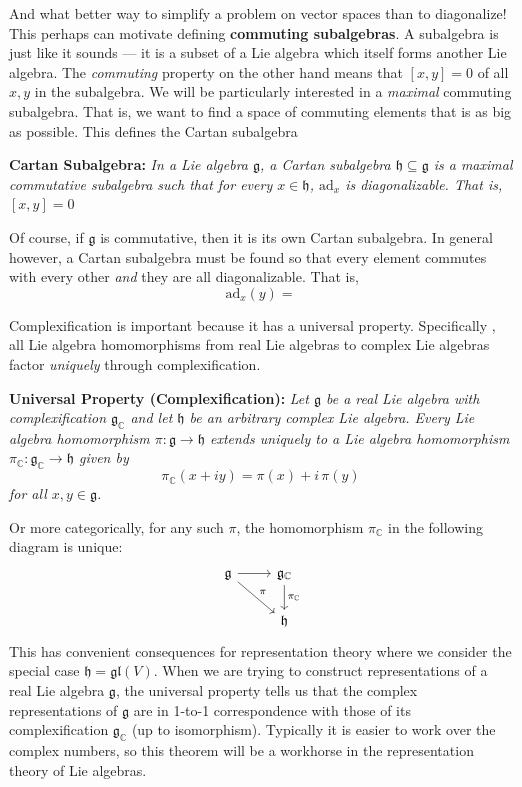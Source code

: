 \documentclass{article}
\renewcommand{\t}[1]{\text{#1}}
\newcommand{\definition}[2]{
	\begin{center}
		\begin{tcolorbox}[colframe=MidnightBlue, colback=black!5, arc=2mm, outer arc=0.5mm, width=\linewidth, left=2mm, right=2mm]
			\textbf{#1:} \emph{#2}	
		\end{tcolorbox}
	\end{center}\noindent}
\begin{document}
And what better way to simplify a problem on vector spaces than to diagonalize! This perhaps can motivate defining \textbf{commuting subalgebras}. A subalgebra is just like it sounds --- it is a subset of a Lie algebra which itself forms another Lie algebra. The \emph{commuting} property on the other hand means that $[x,y]=0$ of all $x,y$ in the subalgebra. We will be particularly interested in a \emph{maximal} commuting subalgebra. That is, we want to find a space of commuting elements that is as big as possible. This defines the Cartan subalgebra

\definition{Cartan Subalgebra}{In a Lie algebra $\mathfrak{g}$, a Cartan subalgebra $\mathfrak{h}\subseteq \mathfrak{g}$ is a maximal commutative subalgebra such that for every $x\in\mathfrak{h}$, $\t{ad}_x$ is diagonalizable. That is,	$[x,y]=0$ }
Of course, if $\mathfrak{g}$ is commutative, then it is its own Cartan subalgebra. In general however, a Cartan subalgebra must be found so that every element commutes with every other \emph{and} they are all diagonalizable. That is, 
$$ \t{ad}_x(y) = 	 $$
	

\newpage

Complexification is important because it has a universal property. Specifically	, all Lie algebra homomorphisms from real Lie algebras to complex Lie algebras factor \emph{uniquely} through complexification.
\definition{Universal Property (Complexification)}{Let $\mathfrak{g}$ be a real Lie algebra with complexification $\mathfrak{g}_\mathbb{C}$ and let $\mathfrak{h}$ be an arbitrary complex Lie algebra. Every Lie algebra homomorphism $\pi:\mathfrak{g}\to\mathfrak{h}$ extends uniquely to a Lie algebra homomorphism $\pi_\mathbb{C}:\mathfrak{g}_\mathbb{C}\to \mathfrak{h}$ given by
	$$ \pi_\mathbb{C}(x+iy) = \pi(x) + i\,\pi(y)$$
for all $x,y\in\mathfrak{g}$.}
Or more categorically, for any such $\pi$, the homomorphism $\pi_\mathbb{C}$ in the following diagram is unique:
$$
\begin{tikzcd}[ampersand replacement=\&]
	\mathfrak{g}\arrow[r] \arrow[rd, "\pi"] \& \mathfrak{g}_\mathbb{C}\arrow[d, "\pi_\mathbb{C}"] \\
	\& \mathfrak{h}
\end{tikzcd}$$
This has convenient consequences for representation theory where we consider the special case $\mathfrak{h}=\mathfrak{gl}(V)$. When we are trying to construct representations of a real Lie algebra $\mathfrak{g}$, the universal property tells us that the complex representations of $\mathfrak{g}$ are in 1-to-1 correspondence with those of its complexification $\mathfrak{g}_\mathbb{C}$ (up to isomorphism). Typically it is easier to work over the complex numbers, so this theorem will be a workhorse in the representation theory of Lie algebras.
\end{document}
